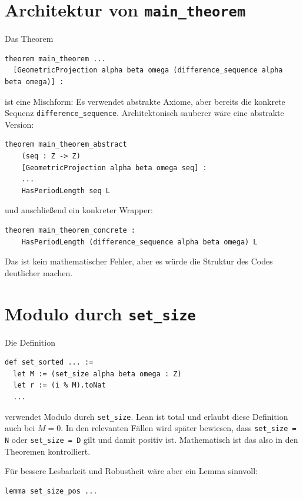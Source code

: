 \documentclass[11pt]{article}
\begin{document}
\section{Architektur von \texttt{main\_theorem}}

Das Theorem

\begin{lstlisting}
theorem main_theorem ...
  [GeometricProjection alpha beta omega (difference_sequence alpha beta omega)] :
\end{lstlisting}

ist eine Mischform: Es verwendet abstrakte Axiome, aber bereits die konkrete Sequenz \texttt{difference\_sequence}. Architektonisch sauberer wäre eine abstrakte Version:

\begin{lstlisting}
theorem main_theorem_abstract
    (seq : Z -> Z)
    [GeometricProjection alpha beta omega seq] :
    ...
    HasPeriodLength seq L
\end{lstlisting}

und anschließend ein konkreter Wrapper:

\begin{lstlisting}
theorem main_theorem_concrete :
    HasPeriodLength (difference_sequence alpha beta omega) L
\end{lstlisting}

Das ist kein mathematischer Fehler, aber es würde die Struktur des Codes deutlicher machen.

\section{Modulo durch \texttt{set\_size}}

Die Definition

\begin{lstlisting}
def set_sorted ... :=
  let M := (set_size alpha beta omega : Z)
  let r := (i % M).toNat
  ...
\end{lstlisting}

verwendet Modulo durch \texttt{set\_size}. Lean ist total und erlaubt diese Definition auch bei \(M=0\). In den relevanten Fällen wird später bewiesen, dass \texttt{set\_size = N} oder \texttt{set\_size = D} gilt und damit positiv ist. Mathematisch ist das also in den Theoremen kontrolliert.

Für bessere Lesbarkeit und Robustheit wäre aber ein Lemma sinnvoll:

\begin{lstlisting}
lemma set_size_pos ...
\end{lstlisting}
\end{document}

